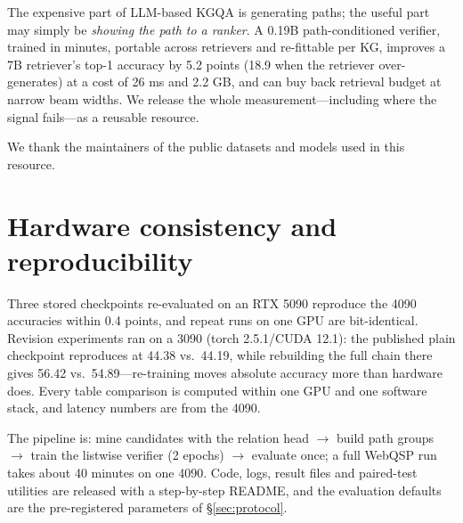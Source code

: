 \documentclass[sigconf,review]{acmart}
\begin{document}
The expensive part of LLM-based KGQA is generating paths; the useful part may simply be \emph{showing the path to a ranker}. A 0.19B path-conditioned verifier, trained in minutes, portable across retrievers and re-fittable per KG, improves a 7B retriever's top-1 accuracy by 5.2 points (18.9 when the retriever over-generates) at a cost of 26 ms and 2.2 GB, and can buy back retrieval budget at narrow beam widths. We release the whole measurement---including where the signal fails---as a reusable resource.

\begin{acks}
We thank the maintainers of the public datasets and models used in this resource.
\end{acks}




\appendix

\section{Hardware consistency and reproducibility}
\label{app:hw}
Three stored checkpoints re-evaluated on an RTX 5090 reproduce the 4090 accuracies within 0.4 points, and repeat runs on one GPU are bit-identical. Revision experiments ran on a 3090 (torch 2.5.1/CUDA 12.1): the published plain checkpoint reproduces at 44.38 vs.\ 44.19, while rebuilding the full chain there gives 56.42 vs.\ 54.89---re-training moves absolute accuracy more than hardware does. Every table comparison is computed within one GPU and one software stack, and latency numbers are from the 4090.

The pipeline is: mine candidates with the relation head $\rightarrow$ build path groups $\rightarrow$ train the listwise verifier (2 epochs) $\rightarrow$ evaluate once; a full WebQSP run takes about 40 minutes on one 4090. Code, logs, result files and paired-test utilities are released with a step-by-step README, and the evaluation defaults are the pre-registered parameters of \S\ref{sec:protocol}.
\end{document}
